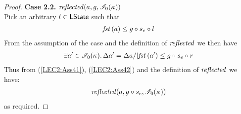\begin{lemma}
\begin{proof}
\noindent\textbf{Case 2.2.} $	\mathit{reflected}(a, g, \mathscr{I}_0(\kappa_{}))$\\
Pick an arbitrary $l \in \textsf{LState}$ such that 
%
\begin{align}
	\mathit{fst}\left(a\right) \leq g \circ s_e \circ l \label{LEC2:Ass41}
\end{align} 
%
From the assumption of the case and the definition of $\mathit{reflected}$ we then have
%
\begin{align}
	\exists a' \in \mathscr{I}_0(\kappa_{}).\, \Delta {a'} = \Delta {a} /| \mathit{fst}\left(a'\right) \leq g \circ s_e \circ r \label{LEC2:Ass42}
\end{align}
%
Thus from (\ref{LEC2:Ass41}), (\ref{LEC2:Ass42}) and the definition of $\mathit{reflected}$ we have:
%
\begin{align*}
	\mathit{reflected}(a, g \circ s_e, \mathscr{I}_0(\kappa_{}))
\end{align*}
%
as required.
%
\end{proof}
\end{lemma}